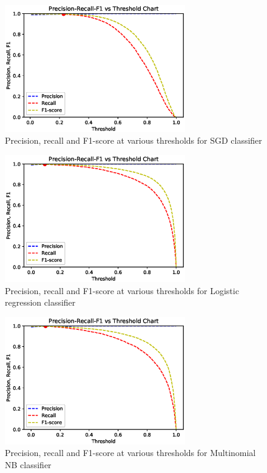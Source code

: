 \begin{figure}[htb]
    \centering
    \includegraphics[width=0.7\textwidth]{imgs/SGDClassifier-prec-rec-thresh.eps}
    \caption{Precision, recall and F1-score at various thresholds for SGD classifier}
    \label{fig:sgd-threshold}
\end{figure}
\FloatBarrier

\begin{figure}[htb]
    \centering
    \includegraphics[width=0.7\textwidth]{imgs/LogisticRegression-prec-rec-thresh.eps}
    \caption{Precision, recall and F1-score at various thresholds for Logistic regression classifier}
    \label{fig:lrc-threshold}
\end{figure}
\FloatBarrier

\begin{figure}[htb]
    \centering
    \includegraphics[width=0.7\textwidth]{imgs/MultinomialNB-prec-rec-thresh.eps}
    \caption{Precision, recall and F1-score at various thresholds for Multinomial NB classifier}
    \label{fig:mnb-threshold}
\end{figure}
\FloatBarrier

